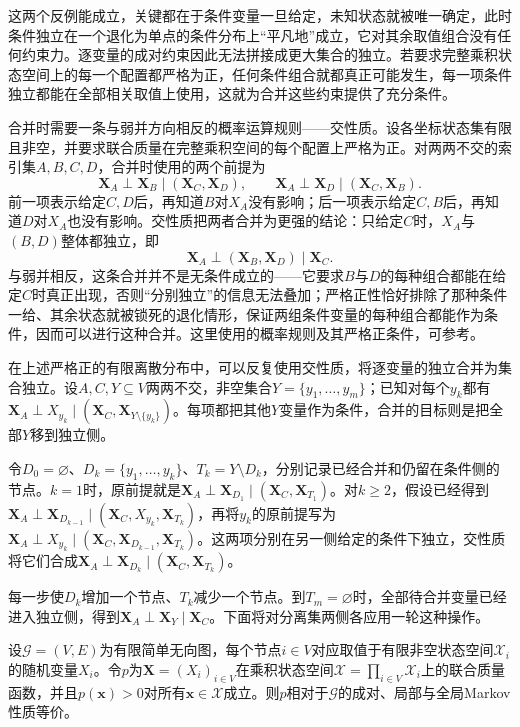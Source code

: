 这两个反例能成立，关键都在于条件变量一旦给定，未知状态就被唯一确定，此时条件独立在一个退化为单点的条件分布上“平凡地”成立，它对其余取值组合没有任何约束力。逐变量的成对约束因此无法拼接成更大集合的独立。若要求完整乘积状态空间上的每一个配置都严格为正，任何条件组合就都真正可能发生，每一项条件独立都能在全部相关取值上使用，这就为合并这些约束提供了充分条件。

合并时需要一条与弱并方向相反的概率运算规则——交性质。设各坐标状态集有限且非空，并要求联合质量在完整乘积空间的每个配置上严格为正。对两两不交的索引集$A,B,C,D$，合并时使用的两个前提为
\[
  \bm{X}_A\perp\bm{X}_B\mid(\bm{X}_C,\bm{X}_D),
  \qquad
  \bm{X}_A\perp\bm{X}_D\mid(\bm{X}_C,\bm{X}_B).
\]
前一项表示给定$C,D$后，再知道$B$对$X_A$没有影响；后一项表示给定$C,B$后，再知道$D$对$X_A$也没有影响。交性质把两者合并为更强的结论：只给定$C$时，$X_A$与$(B,D)$整体都独立，即
\[
  \bm{X}_A\perp(\bm{X}_B,\bm{X}_D)\mid\bm{X}_C.
\]
与弱并相反，这条合并并不是无条件成立的——它要求$B$与$D$的每种组合都能在给定$C$时真正出现，否则“分别独立”的信息无法叠加；严格正性恰好排除了那种条件一给、其余状态就被锁死的退化情形，保证两组条件变量的每种组合都能作为条件，因而可以进行这种合并。这里使用的概率规则及其严格正条件，可参考。

在上述严格正的有限离散分布中，可以反复使用交性质，将逐变量的独立合并为集合独立。设$A,C,Y\subseteq V$两两不交，非空集合$Y=\{y_1,\ldots,y_m\}$；已知对每个$y_k$都有$\bm{X}_A\perp X_{y_k}\mid(\bm{X}_C,\bm{X}_{Y\setminus\{y_k\}})$。每项都把其他$Y$变量作为条件，合并的目标则是把全部$Y$移到独立侧。

令$D_0=\varnothing$、$D_k=\{y_1,\ldots,y_k\}$、$T_k=Y\setminus D_k$，分别记录已经合并和仍留在条件侧的节点。$k=1$时，原前提就是$\bm{X}_A\perp\bm{X}_{D_1}\mid(\bm{X}_C,\bm{X}_{T_1})$。对$k\geq2$，假设已经得到$\bm{X}_A\perp\bm{X}_{D_{k-1}}\mid(\bm{X}_C,X_{y_k},\bm{X}_{T_k})$，再将$y_k$的原前提写为$\bm{X}_A\perp X_{y_k}\mid(\bm{X}_C,\bm{X}_{D_{k-1}},\bm{X}_{T_k})$。这两项分别在另一侧给定的条件下独立，交性质将它们合成$\bm{X}_A\perp\bm{X}_{D_k}\mid(\bm{X}_C,\bm{X}_{T_k})$。

每一步使$D_k$增加一个节点、$T_k$减少一个节点。到$T_m=\varnothing$时，全部待合并变量已经进入独立侧，得到$\bm{X}_A\perp\bm{X}_Y\mid\bm{X}_C$。下面将对分离集两侧各应用一轮这种操作。

\begin{theorem}[严格正条件下三种Markov性质等价]
  \label{thm:pgm-undirected-markov-equivalence}
  设$\mathcal{G}=(V,E)$为有限简单无向图，每个节点$i\in V$对应取值于有限非空状态空间$\mathcal{X}_i$的随机变量$X_i$。令$p$为$\bm{X}=(X_i)_{i\in V}$在乘积状态空间$\mathcal{X}=\prod_{i\in V}\mathcal{X}_i$上的联合质量函数，并且$p(\bm{x})>0$对所有$\bm{x}\in\mathcal{X}$成立。则$p$相对于$\mathcal{G}$的成对、局部与全局Markov性质等价。
\end{theorem}


